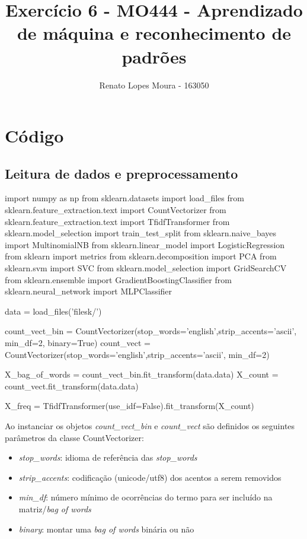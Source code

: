 \documentclass{article}
\title{Exercício 6 - MO444 - Aprendizado de máquina e reconhecimento de padrões}
\date{}
\author{Renato Lopes Moura - 163050}
\begin{document}
\maketitle

\section{Código}
\subsection{Leitura de dados e preprocessamento}
%
\begin{tcolorbox}
\begin{python}
import numpy as np
from sklearn.datasets import load_files
from sklearn.feature_extraction.text import CountVectorizer
from sklearn.feature_extraction.text import TfidfTransformer
from sklearn.model_selection import train_test_split
from sklearn.naive_bayes import MultinomialNB
from sklearn.linear_model import LogisticRegression
from sklearn import metrics
from sklearn.decomposition import PCA
from sklearn.svm import SVC
from sklearn.model_selection import GridSearchCV
from sklearn.ensemble import GradientBoostingClassifier
from sklearn.neural_network import MLPClassifier

data = load_files('filesk/')

count_vect_bin = CountVectorizer(stop_words='english',strip_accents='ascii', min_df=2, binary=True)
count_vect = CountVectorizer(stop_words='english',strip_accents='ascii', min_df=2)

X_bag_of_words = count_vect_bin.fit_transform(data.data)
X_count = count_vect.fit_transform(data.data)

X_freq = TfidfTransformer(use_idf=False).fit_transform(X_count)
\end{python}
\end{tcolorbox}

Ao instanciar os objetos \textit{count\_vect\_bin} e \textit{count\_vect} são definidos os seguintes parâmetros da classe CountVectorizer:
\begin{itemize}
\item \textit{stop\_words}: idioma de referência das \textit{stop\_words}
\item \textit{strip\_accents}: codificação (unicode/utf8) dos acentos a serem removidos
\item \textit{min\_df}: número mínimo de ocorrências do termo para ser incluído na matriz/\textit{bag of words}
\item \textit{binary}: montar uma \textit{bag of words} binária ou não
\end{itemize}
\end{document}
